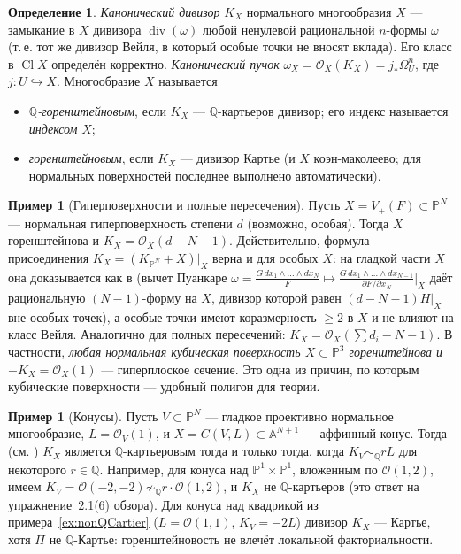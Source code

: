 \documentclass[11pt,a4paper]{article}
\theoremstyle{plain}
\theoremstyle{definition}
\newtheorem{definition}[theorem]{Определение}
\newtheorem{example}[theorem]{Пример}
\theoremstyle{remark}
\newcommand{\Q}{\mathbb{Q}}
\newcommand{\PP}{\mathbb{P}}
\newcommand{\A}{\mathbb{A}}
\newcommand{\cO}{\mathcal{O}}
\DeclareMathOperator{\Cl}{Cl}
\DeclareMathOperator{\divv}{div}
\begin{document}
\begin{definition}
\emph{Канонический дивизор} $K_X$ нормального многообразия $X$ --- замыкание в $X$ дивизора
$\divv(\omega)$ любой ненулевой рациональной $n$-формы $\omega$ (т.\,е. тот же дивизор Вейля, в
который особые точки не вносят вклада). Его класс в $\Cl X$ определён корректно. \emph{Канонический
пучок} $\omega_X=\cO_X(K_X)=j_*\Omega^n_U$, где $j\colon U\hookrightarrow X$.
Многообразие $X$ называется
\begin{itemize}
\item \emph{$\Q$-горенштейновым}, если $K_X$ --- $\Q$-картьеров дивизор; его индекс называется
\emph{индексом} $X$;
\item \emph{горенштейновым}, если $K_X$ --- дивизор Картье (и $X$ коэн-маколеево; для нормальных
поверхностей последнее выполнено автоматически).
\end{itemize}
\end{definition}

\begin{example}[Гиперповерхности и полные пересечения]\label{ex:hyp-Gor}
Пусть $X=V_+(F)\subset\PP^N$ --- нормальная гиперповерхность степени $d$ (возможно, особая).
Тогда $X$ горенштейнова и $K_X=\cO_X(d-N-1)$. Действительно, формула присоединения
$K_X=(K_{\PP^N}+X)|_X$ верна и для особых $X$: на гладкой части $X$ она доказывается как в
\cite[\S\,5]{AG} (вычет Пуанкаре $\omega=\frac{G\,dx_1\wedge\dots\wedge dx_N}{F}\mapsto
\frac{G\,dx_1\wedge\dots\wedge dx_{N-1}}{\partial F/\partial x_N}\big|_X$ даёт рациональную
$(N-1)$-форму на $X$, дивизор которой равен $(d-N-1)H|_X$ вне особых точек), а особые точки имеют
коразмерность $\ge2$ в $X$ и не влияют на класс Вейля. Аналогично для полных пересечений:
$K_X=\cO_X(\sum d_i-N-1)$. В частности, \emph{любая нормальная кубическая поверхность
$X\subset\PP^3$ горенштейнова и $-K_X=\cO_X(1)$} --- гиперплоское сечение. Это одна из причин,
по которым кубические поверхности --- удобный полигон для теории.
\end{example}

\begin{example}[Конусы]\label{ex:cone-canonical}
Пусть $V\subset\PP^N$ --- гладкое проективно нормальное многообразие, $L=\cO_V(1)$, и
$X=C(V,L)\subset\A^{N+1}$ --- аффинный конус. Тогда (см. \cite[3.1]{KolSing}) $K_X$ является
$\Q$-картьеровым тогда и только тогда, когда $K_V\sim_\Q rL$ для некоторого $r\in\Q$. Например,
для конуса над $\PP^1\times\PP^1$, вложенным по $\cO(1,2)$, имеем $K_V=\cO(-2,-2)\not\sim_\Q
r\cdot\cO(1,2)$, и $K_X$ не $\Q$-картьеров (это ответ на упражнение~2.1(6) обзора). Для конуса над
квадрикой из примера~\ref{ex:nonQCartier} ($L=\cO(1,1)$, $K_V=-2L$) дивизор $K_X$ --- Картье,
хотя $\Pi$ не $\Q$-Картье: горенштейновость не влечёт локальной факториальности.
\end{example}
\end{document}
